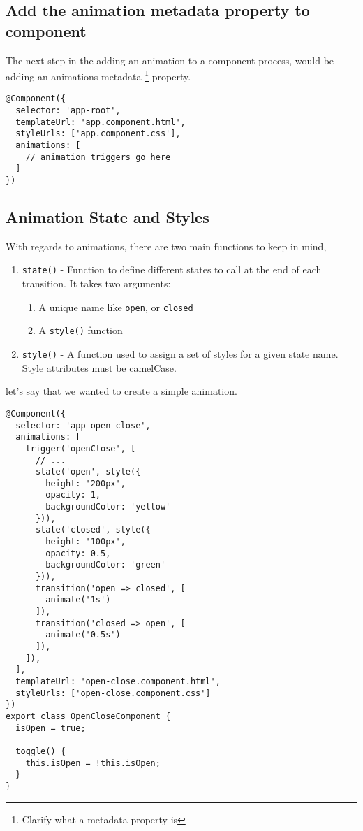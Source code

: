 \subsection{Add the animation metadata property to component}
The next step in the adding an animation to a component process, would be 
adding an animations metadata \footnote{Clarify what a metadata property is}
property.

\begin{lstlisting}
@Component({
  selector: 'app-root',
  templateUrl: 'app.component.html',
  styleUrls: ['app.component.css'],
  animations: [
    // animation triggers go here
  ]
})  
\end{lstlisting}

\subsection{ Animation State and Styles }
With regards to animations, there are two main functions to keep in mind, 
\begin{enumerate}
  \item \lstinline{state()} - Function to define different states to call at 
  the end of each transition. It takes two arguments: 
    \begin{enumerate}
      \item A unique name like \lstinline{open}, or \lstinline{closed}
      \item A \lstinline{style()} function 
    \end{enumerate}
  \item \lstinline{style()} - A function used to assign a set of styles for 
  a given state name. Style attributes must be camelCase.
\end{enumerate}

let's say that we wanted to create a simple animation. 

\begin{lstlisting}
@Component({
  selector: 'app-open-close',
  animations: [
    trigger('openClose', [
      // ...
      state('open', style({
        height: '200px',
        opacity: 1,
        backgroundColor: 'yellow'
      })),
      state('closed', style({
        height: '100px',
        opacity: 0.5,
        backgroundColor: 'green'
      })),
      transition('open => closed', [
        animate('1s')
      ]),
      transition('closed => open', [
        animate('0.5s')
      ]),
    ]),
  ],
  templateUrl: 'open-close.component.html',
  styleUrls: ['open-close.component.css']
})
export class OpenCloseComponent {
  isOpen = true;

  toggle() {
    this.isOpen = !this.isOpen;
  }
}
\end{lstlisting}